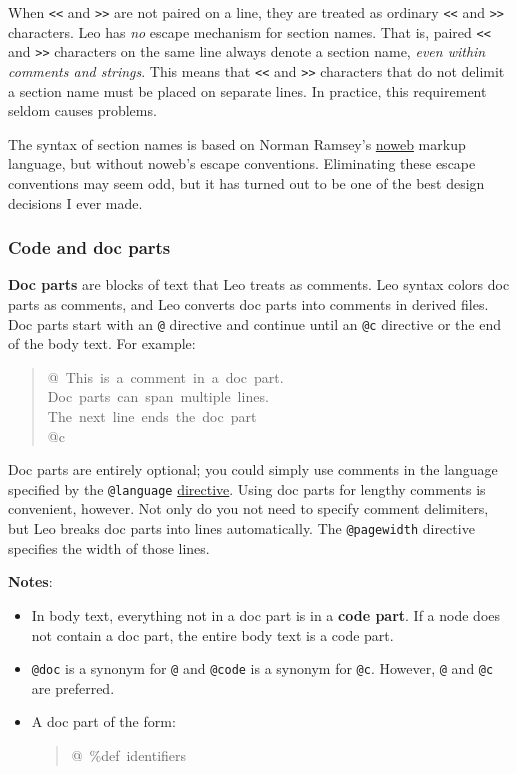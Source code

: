 \documentclass[10pt,a4paper,english]{article}
\begin{document}
When \texttt{<{}<} and \texttt{>{}>} are not paired on a line,
they are treated as ordinary \texttt{<{}<} and \texttt{>{}>} characters.
Leo has \emph{no} escape mechanism for section names.
That is, paired \texttt{<{}<} and \texttt{>{}>} characters on the same line always denote a section name,
\emph{even within comments and strings}.
This means that \texttt{<{}<} and \texttt{>{}>} characters that do not delimit a section name must be placed on separate lines.
In practice, this requirement seldom causes problems.

The syntax of section names is based on Norman Ramsey's \href{http://www.eecs.harvard.edu/~nr/noweb/}{noweb} markup language,
but without noweb's escape conventions.
Eliminating these escape conventions may seem odd,
but it has turned out to be one of the best design decisions I ever made.



\hypertarget{code-and-doc-parts}{}
\subsubsection*{Code and doc parts}

\textbf{Doc parts} are blocks of text that Leo treats as comments.
Leo syntax colors doc parts as comments,
and Leo converts doc parts into comments in derived files.
Doc parts start with an \texttt{@} directive and continue until
an \texttt{@c} directive or the end of the body text.
For example:
\begin{quote}{\ttfamily \raggedright \noindent
@~This~is~a~comment~in~a~doc~part.~\\
Doc~parts~can~span~multiple~lines.~\\
The~next~line~ends~the~doc~part~\\
@c
}\end{quote}

Doc parts are entirely optional;
you could simply use comments in the language specified by the \texttt{@language} \href{\#leo-directives}{directive}.
Using doc parts for lengthy comments is convenient, however.
Not only do you not need to specify comment delimiters,
but Leo breaks doc parts into lines automatically.
The \texttt{@pagewidth} directive specifies the width of those lines.

\textbf{Notes}:
\begin{itemize}
\item {} 
In body text, everything not in a doc part is in a \textbf{code part}.
If a node does not contain a doc part, the entire body text is a code part.

\item {} 
\texttt{@doc} is a synonym for \texttt{@} and \texttt{@code} is a synonym for \texttt{@c}.
However, \texttt{@} and \texttt{@c} are preferred.

\item {} 
A doc part of the form:
\begin{quote}{\ttfamily \raggedright \noindent
@~{\%}def~identifiers
}\end{quote}

\end{itemize}
\end{document}
